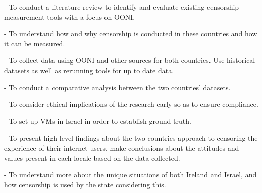 -   To conduct a literature review to identify and evaluate existing censorship measurement tools with a focus on OONI. 

-   To understand how and why censorship is conducted in these countries and how it can be measured. 

-   To collect data using OONI and other sources for both countries. Use historical datasets as well as rerunning tools for up to date data. 

-   To conduct a comparative analysis between the two countries’ datasets. 

-   To consider ethical implications of the research early so as to ensure compliance. 

-   To set up VMs in Israel in order to establish ground truth. 

-   To present high-level findings about the two countries approach to censoring the 
experience of their internet users, make conclusions about the attitudes and values 
present in each locale based on the data collected. 

-   To understand more about the unique situations of both Ireland and Israel, and how 
censorship is used by the state considering this.

